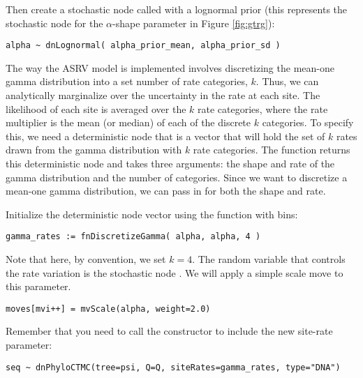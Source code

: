 Then create a stochastic node called  with a lognormal prior (this represents the stochastic node for the $\alpha$-shape parameter in Figure \ref{fig:gtrg}):
{\tt\begin{snugshade*}
\begin{lstlisting}
alpha ~ dnLognormal( alpha_prior_mean, alpha_prior_sd )
\end{lstlisting}
\end{snugshade*}}

The way the ASRV model is implemented involves discretizing the mean-one gamma distribution into a set number of rate categories, $k$. 
Thus, we can analytically marginalize over the uncertainty in the rate at each site. 
The likelihood of each site is averaged over the $k$ rate categories, where the rate multiplier is the mean (or median) of each of the discrete $k$ categories. 
To specify this, we need a deterministic node that is a vector that will hold the set of $k$ rates drawn from the gamma distribution with $k$ rate categories. 
The  function returns this deterministic node and takes three arguments: the shape and rate of the gamma distribution and the number of categories. 
Since we want to discretize a mean-one gamma distribution, we can pass in  for both the shape and rate.

Initialize the  deterministic node vector using the   function with  bins:
{\tt \begin{snugshade*}
\begin{lstlisting}
gamma_rates := fnDiscretizeGamma( alpha, alpha, 4 )
\end{lstlisting}
\end{snugshade*}}

Note that here, by convention, we set $k = 4$.
The random variable that controls the rate variation is the stochastic node . 
We will apply a simple scale move to this parameter.
{\tt \begin{snugshade*}
\begin{lstlisting}
moves[mvi++] = mvScale(alpha, weight=2.0)
\end{lstlisting}
\end{snugshade*}}

Remember that you need to call the  constructor to include the new site-rate parameter:
{\tt \begin{snugshade*}
\begin{lstlisting}
seq ~ dnPhyloCTMC(tree=psi, Q=Q, siteRates=gamma_rates, type="DNA")
\end{lstlisting}
\end{snugshade*}}


